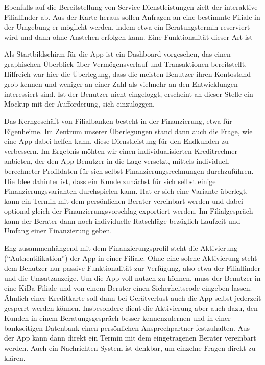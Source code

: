     Ebenfalls auf die Bereitstellung von Service-Dienstleistungen zielt der interaktive Filialfinder ab. Aus der Karte heraus sollen Anfragen an eine bestimmte Filiale in der Umgebung er möglicht werden, indem etwa ein Beratungstermin reserviert wird und dann ohne Anstehen erfolgen kann. Eine Funktionalität dieser Art ist 
      
    Als Startbildschirm für die App ist ein Dashboard vorgesehen, das einen graphischen Überblick über Vermögensverlauf und Transaktionen bereitstellt. Hilfreich war hier die Überlegung, dass die meisten Benutzer ihren Kontostand grob kennen und weniger an einer Zahl als vielmehr an den Entwicklungen interessiert sind. Ist der Benutzer nicht eingeloggt, erscheint an dieser Stelle ein Mockup mit der Aufforderung, sich einzuloggen.
    
    Das Kerngeschäft von Filialbanken besteht in der Finanzierung, etwa für Eigenheime. Im Zentrum unserer Überlegungen stand dann auch die Frage, wie eine App dabei helfen kann, diese Dienstleistung für den Endkunden zu verbessern. Im Ergebnis möhten wir einen individualisierten Kreditrechner anbieten, der den App-Benutzer in die Lage versetzt, mittels individuell berechneter Profildaten für sich selbst Finanzierungsrechnungen durchzuführen. Die Idee dahinter ist, dass ein Kunde zunächst für sich selbst einige Finanzierungsvarianten durchspielen kann. Hat er sich eine Variante überlegt, kann ein Termin mit dem persönlichen Berater vereinbart werden und dabei optional gleich der Finanzierungsvorschlag exportiert werden. Im Filialgespräch kann der Berater dann noch individuelle Ratschläge bezüglich Laufzeit und Umfang einer Finanzierung geben.
    
	Eng zusammenhängend mit dem Finanzierungsprofil steht die Aktivierung ("`Authentifikation"') der App in einer Filiale. Ohne eine solche Aktivierung steht dem Benutzer nur passive Funktionalität zur Verfügung, also etwa der Filialfinder und die Umsatzanzeige. Um die App voll nutzen zu können, muss der Benutzer in eine KiBa-Filiale und von einem Berater einen Sicherheitscode eingeben lassen. Ähnlich einer Kreditkarte soll dann bei Gerätverlust auch die App selbst jederzeit gesperrt werden können. Insbesondere dient die Aktivierung aber auch dazu, den Kunden in einem Beratungsgespräch besser kennenzulernen und in einer bankseitigen Datenbank einen persönlichen Ansprechpartner festzuhalten. Aus der App kann dann direkt ein Termin mit dem eingetragenen Berater vereinbart werden. Auch ein Nachrichten-System ist denkbar, um einzelne Fragen direkt zu klären.